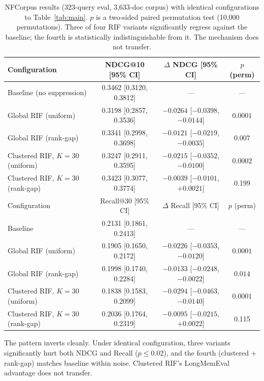 \documentclass[11pt,a4paper]{article}
\begin{document}
\begin{table}[ht]
\centering
\small
\caption{NFCorpus results (323-query eval, 3,633-doc corpus) with identical configurations to Table~\ref{tab:main}. $p$ is a two-sided paired permutation test (10,000 permutations). Three of four RIF variants significantly regress against the baseline; the fourth is statistically indistinguishable from it. The mechanism does not transfer.}
\label{tab:nfcorpus}
\begin{tabular}{lccc}
\toprule
Configuration & NDCG@10 [95\% CI] & $\Delta$ NDCG [95\% CI] & $p$ (perm) \\
\midrule
Baseline (no suppression) & 0.3462 [0.3120, 0.3812] & --- & --- \\
Global RIF (uniform) & 0.3198 [0.2857, 0.3536] & $\mathbf{-0.0264}$ [$-0.0398$, $-0.0144$] & $\mathbf{0.0001}$ \\
Global RIF (rank-gap) & 0.3341 [0.2998, 0.3698] & $\mathbf{-0.0121}$ [$-0.0219$, $-0.0035$] & $\mathbf{0.007}$ \\
Clustered RIF, $K=30$ (uniform) & 0.3247 [0.2911, 0.3595] & $\mathbf{-0.0215}$ [$-0.0352$, $-0.0100$] & $\mathbf{0.0002}$ \\
Clustered RIF, $K=30$ (rank-gap) & 0.3423 [0.3077, 0.3774] & $-0.0039$ [$-0.0101$, $+0.0021$] & 0.199 \\
\midrule
Configuration & Recall@30 [95\% CI] & $\Delta$ Recall [95\% CI] & $p$ (perm) \\
\midrule
Baseline & 0.2131 [0.1861, 0.2413] & --- & --- \\
Global RIF (uniform) & 0.1905 [0.1650, 0.2172] & $\mathbf{-0.0226}$ [$-0.0353$, $-0.0120$] & $\mathbf{0.0001}$ \\
Global RIF (rank-gap) & 0.1998 [0.1740, 0.2284] & $\mathbf{-0.0133}$ [$-0.0248$, $-0.0022$] & $\mathbf{0.014}$ \\
Clustered RIF, $K=30$ (uniform) & 0.1838 [0.1583, 0.2099] & $\mathbf{-0.0294}$ [$-0.0463$, $-0.0140$] & $\mathbf{0.0001}$ \\
Clustered RIF, $K=30$ (rank-gap) & 0.2036 [0.1764, 0.2319] & $-0.0095$ [$-0.0215$, $+0.0022$] & 0.115 \\
\bottomrule
\end{tabular}
\end{table}

The pattern inverts cleanly. Under identical configuration, three variants significantly hurt both NDCG and Recall ($p \leq 0.02$), and the fourth (clustered + rank-gap) matches baseline within noise. Clustered RIF's LongMemEval advantage does not transfer.
\end{document}
